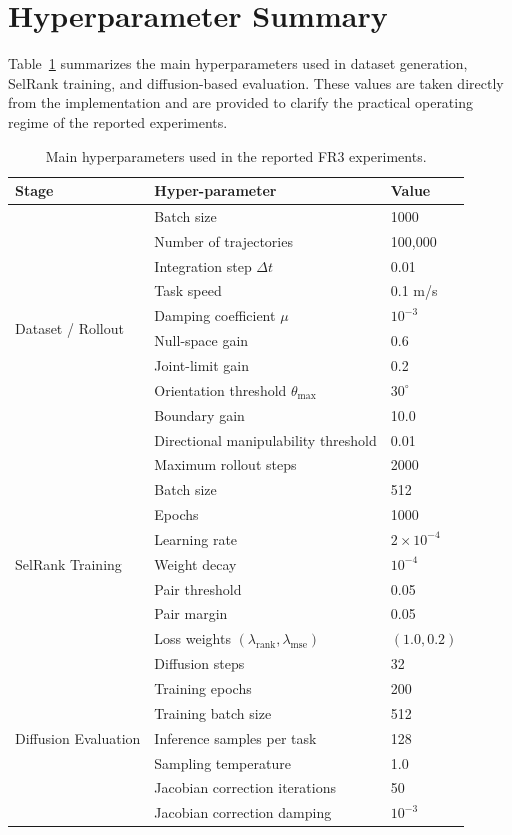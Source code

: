 \documentclass[journal, twoside]{IEEEtran}
\begin{document}

\appendices
\section{Hyperparameter Summary}
Table~\ref{tab:all_hparams} summarizes the main hyperparameters used in dataset generation, SelRank training, and diffusion-based evaluation. These values are taken directly from the implementation and are provided to clarify the practical operating regime of the reported experiments.

\begin{table}[!t]
\caption{Main hyperparameters used in the reported FR3 experiments.}
\label{tab:all_hparams}
\centering
\begin{tabular}{@{}lll@{}}
\toprule
\textbf{Stage} & \textbf{Hyper-parameter} & \textbf{Value} \\
\midrule
\multirow{10}{*}{Dataset / Rollout} & Batch size & 1000 \\
 & Number of trajectories & 100,000 \\
 & Integration step $\Delta t$ & 0.01 \\
 & Task speed & 0.1 m/s \\
 & Damping coefficient $\mu$ & $10^{-3}$ \\
 & Null-space gain & 0.6 \\
 & Joint-limit gain & 0.2 \\
 & Orientation threshold $\theta_{\max}$ & $30^\circ$ \\
 & Boundary gain & 10.0 \\
 & Directional manipulability threshold & 0.01 \\
 & Maximum rollout steps & 2000 \\
\midrule
\multirow{7}{*}{SelRank Training} & Batch size & 512 \\
 & Epochs & 1000 \\
 & Learning rate & $2\times 10^{-4}$ \\
 & Weight decay & $10^{-4}$ \\
 & Pair threshold & 0.05 \\
 & Pair margin & 0.05 \\
 & Loss weights $(\lambda_{\mathrm{rank}}, \lambda_{\mathrm{mse}})$ & $(1.0, 0.2)$ \\
\midrule
\multirow{7}{*}{Diffusion Evaluation} & Diffusion steps & 32 \\
 & Training epochs & 200 \\
 & Training batch size & 512 \\
 & Inference samples per task & 128 \\
 & Sampling temperature & 1.0 \\
 & Jacobian correction iterations & 50 \\
 & Jacobian correction damping & $10^{-3}$ \\
\bottomrule
\end{tabular}
\end{table}



\normalem


\end{document}
